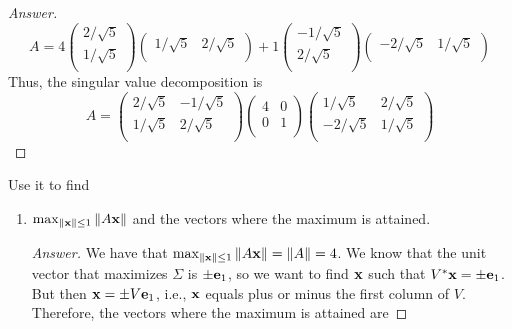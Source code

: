\documentclass[../psets.tex]{subfiles}
\begin{document}
\begin{enumerate}[label={\textbf{3.\arabic*.}}]
\begin{proof}[Answer]
\begin{equation*}
            A = 4
            \begin{pmatrix}
                2/\sqrt{5}\\
                1/\sqrt{5}\\
            \end{pmatrix}
            \begin{pmatrix}
                1/\sqrt{5} & 2/\sqrt{5}\\
            \end{pmatrix}
            +1
            \begin{pmatrix}
                -1/\sqrt{5}\\
                2/\sqrt{5}\\
            \end{pmatrix}
            \begin{pmatrix}
                -2/\sqrt{5} & 1/\sqrt{5}\\
            \end{pmatrix}
        \end{equation*}
        Thus, the singular value decomposition is
        \begin{equation*}
            A =
            \begin{pmatrix}
                2/\sqrt{5} & -1/\sqrt{5}\\
                1/\sqrt{5} & 2/\sqrt{5}\\
            \end{pmatrix}
            \begin{pmatrix}
                4 & 0\\
                0 & 1\\
            \end{pmatrix}
            \begin{pmatrix}
                1/\sqrt{5} & 2/\sqrt{5}\\
                -2/\sqrt{5} & 1/\sqrt{5}\\
            \end{pmatrix}
        \end{equation*}
    \end{proof}
    Use it to find
    \begin{enumerate}
        \item $\max_{\norm{\mathbf{x}}\leq 1}\norm{A\mathbf{x}}$ and the vectors where the maximum is attained.
        \begin{proof}[Answer]
            We have that $\max_{\norm{\mathbf{x}}\leq 1}\norm{A\mathbf{x}}=\norm{A}=4$. We know that the unit vector that maximizes $\Sigma$ is $\pm\mathbf{e}_1$, so we want to find $\mathbf{x}$ such that $V^*\mathbf{x}=\pm\mathbf{e}_1$. But then $\mathbf{x}=\pm V\mathbf{e}_1$, i.e., $\mathbf{x}$ equals plus or minus the first column of $V$. Therefore, the vectors where the maximum is attained are

\end{proof}
\end{enumerate}
\end{enumerate}
\end{document}
